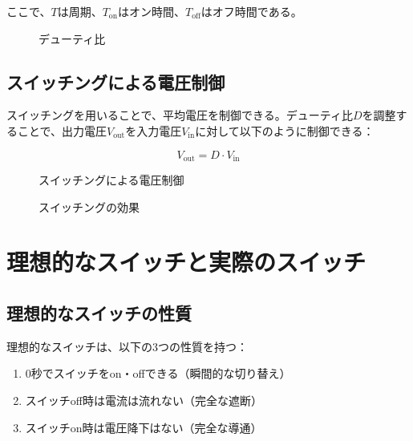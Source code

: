 ここで、$T$は周期、$T_{\text{on}}$はオン時間、$T_{\text{off}}$はオフ時間である。

\begin{figure}[H]
\centering
{}
\caption{デューティ比}
\label{fig:duty_ratio}
\end{figure}

\subsection{スイッチングによる電圧制御}

スイッチングを用いることで、平均電圧を制御できる。デューティ比$D$を調整することで、出力電圧$V_{\text{out}}$を入力電圧$V_{\text{in}}$に対して以下のように制御できる：

\begin{equation}
V_{\text{out}} = D \cdot V_{\text{in}}
\end{equation}

\begin{figure}[H]
\centering
{}
\caption{スイッチングによる電圧制御}
\label{fig:switching_control}
\end{figure}

\begin{figure}[H]
\centering
{}
\caption{スイッチングの効果}
\label{fig:switching_effect}
\end{figure}

\section{理想的なスイッチと実際のスイッチ}

\subsection{理想的なスイッチの性質}

理想的なスイッチは、以下の3つの性質を持つ：

\begin{enumerate}
\item 0秒でスイッチをon・offできる（瞬間的な切り替え）
\item スイッチoff時は電流は流れない（完全な遮断）
\item スイッチon時は電圧降下はない（完全な導通）
\end{enumerate}

